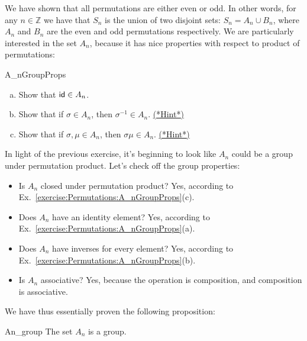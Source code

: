 We have shown that all permutations are either even or odd. In other words, for any $n \in \mathbb{Z}$ we have that $S_n$ is the union of two disjoint sets: $S_n = A_n \cup B_n$, where $A_n$ and $B_n$ are the even and odd permutations respectively.
We are particularly interested in the set $A_n$, because it has nice properties with respect to product of permutations:

\begin{exercise}{A_nGroupProps}
\begin{enumerate}[(a)]
\item
Show that ${\sf{i}d}  \in A_n$.
\item
Show that if $\sigma \in A_n$, then $\sigma^{-1} \in A_n$.
\hyperref[sec:Permutations:Hints]{(*Hint*)}
\item
Show that if $\sigma, \mu \in A_n$, then $\sigma \mu \in A_n$. 
\hyperref[sec:Permutations:Hints]{(*Hint*)}
\end{enumerate}
\end{exercise}

In light of the previous exercise, it's beginning to look like $A_n$ could be a group under permutation product. Let's check off the group properties:
\begin{itemize}
\item Is $A_n$ closed under permutation product? Yes, according to Ex.~\ref{exercise:Permutations:A_nGroupProps}(c).
\item Does $A_n$ have an identity element? Yes, according to Ex.~\ref{exercise:Permutations:A_nGroupProps}(a).
\item Does $A_n$ have inverses for every element? Yes, according to Ex.~\ref{exercise:Permutations:A_nGroupProps}(b).
\item Is $A_n$ associative? Yes, because the operation is composition, and composition is associative.
\end{itemize}

\noindent
We have thus essentially proven the following proposition:

\begin{prop}{An_group}
The set $A_n$ is a group. 
\end{prop}


